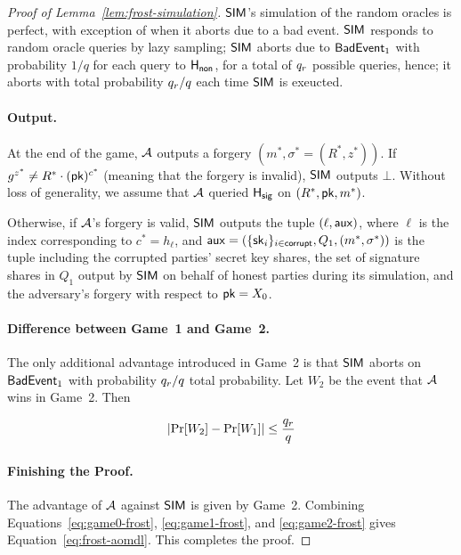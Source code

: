 \begin{proof}[Proof of Lemma~\ref{lem:frost-simulation}]
  $\mathsf{SIM}$'s simulation of the random oracles is perfect,
  with exception of when it aborts due to a bad event.
  $\mathsf{SIM}$ responds to random oracle queries by lazy sampling;
  $\mathsf{SIM}$ aborts due to $\mathsf{BadEvent}_1$ with probability $1/q$ for each query to $\mathsf{H_{non}}$,
  for a total of $q_r$ possible queries,
  hence;
  it aborts with total probability $q_r/q$ each time $\mathsf{SIM}$ is exeucted.


\paragraph{Output.} At the end of the game,
$\mathcal{A}$ outputs a forgery $(m^*, \sigma^* = (R^*, z^*))$.
If $g^{z^*} \neq R^* \cdot (\mathsf{pk})^{c^*}$ (meaning that the forgery is invalid),
$\mathsf{SIM}$ outputs $\bot$.
Without loss of generality,
we assume that $\mathcal{A}$ queried $\mathsf{H_{sig}}$ on $(R^*, \mathsf{pk}, m^*)$.


Otherwise,
if $\mathcal{A}$'s forgery is valid,
$\mathsf{SIM}$ outputs the tuple $(\ell, \mathsf{aux})$,
where $\ell$ is the index corresponding to $c^* = h_\ell$,
and $\mathsf{aux}=(\{ \mathsf{sk}_i\}_{i \in \mathsf{corrupt}}, Q_1,  (m^*, \sigma^*))$ is the tuple
including the corrupted parties' secret key shares,
the set of signature shares in $Q_1$ output by $\mathsf{SIM}$ on behalf of honest parties during its simulation,
and the adversary's forgery with respect to $\mathsf{pk}=X_0$.

  \paragraph{Difference between Game~1 and Game~2.}
  The only additional advantage introduced in Game~2 is that $\mathsf{SIM}$ aborts on   $\mathsf{BadEvent}_1$
  with probability $q_r/q$ total probability.
  Let $W_2$ be the event that $\mathcal{A}$ wins in Game~2.
  Then

  \begin{equation} \label{eq:game2-frost}
    \lvert \Pr[W_2] - \Pr[W_1] \rvert \leq  \frac{q_r}{q}
  \end{equation}


\medskip

  \paragraph{Finishing the Proof.}
  The advantage of $\mathcal{A}$ against $\mathsf{SIM}$ is given by Game~2.
  Combining Equations~\ref{eq:game0-frost}, \ref{eq:game1-frost},
  and \ref{eq:game2-frost}  gives Equation~\ref{eq:frost-aomdl}.
  This completes the proof.
\end{proof}



